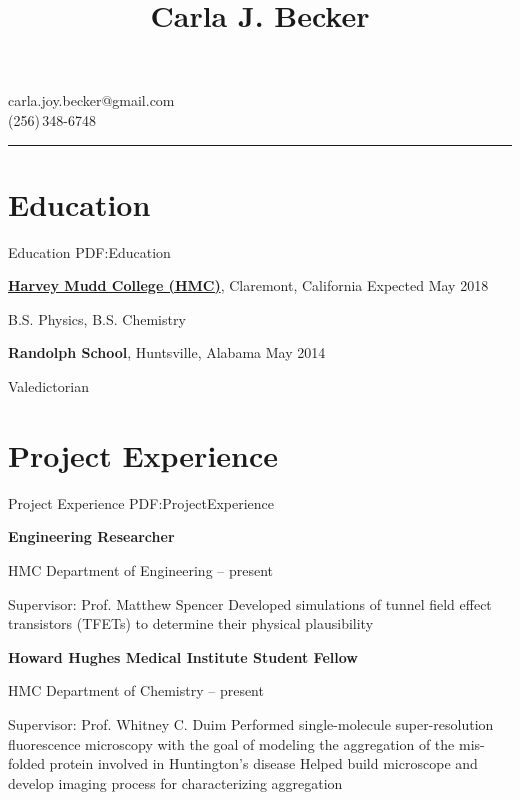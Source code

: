 \documentclass[letterpaper,10pt,oneside]{article}
\newcommand{\CVAuthor}{Carla J. Becker}
\begin{document}

\title{\CVAuthor}

\begin{subtitle}
carla.joy.becker@gmail.com
\\
(256)\,348-6748 
\end{subtitle}
\vspace{2mm}
\hrule
\begin{body}


\section
{Education}
{Education}
{PDF:Education}

\href{https://www.hmc.edu/}
{\textbf{Harvey Mudd College (HMC)}},
Claremont, California
\hfill
Expected May 2018

\GapNoBreak
\BulletItem
B.S. Physics, B.S. Chemistry

\Gap
{\textbf{Randolph School}},
Huntsville, Alabama
\hfill
May 2014

\GapNoBreak
\BulletItem
Valedictorian


\section
{Project Experience}
{Project Experience}
{PDF:ProjectExperience}

{\textbf{Engineering Researcher}}

\GapNoBreak
\BulletItem
HMC Department of Engineering
\hfill
{} --
present
\begin{detail}
\SubBulletItem
Supervisor:
Prof. Matthew Spencer
\SubBulletItemBullet
Developed simulations of tunnel field effect transistors (TFETs) to determine their physical plausibility
\end{detail}

\BigGap

{\textbf{Howard Hughes Medical Institute Student Fellow}}

\GapNoBreak
\BulletItem
HMC Department of Chemistry
\hfill
{} --
present
\begin{detail}
\SubBulletItem
Supervisor:
Prof. Whitney C. Duim
\SubBulletItemBullet
Performed single-molecule super-resolution fluorescence microscopy with the goal of modeling the aggregation of the mis-folded protein involved in	Huntington's disease
\SubBulletItemBullet
Helped build microscope and develop imaging process for 			characterizing aggregation
\end{detail}


\end{body}
\end{document}
